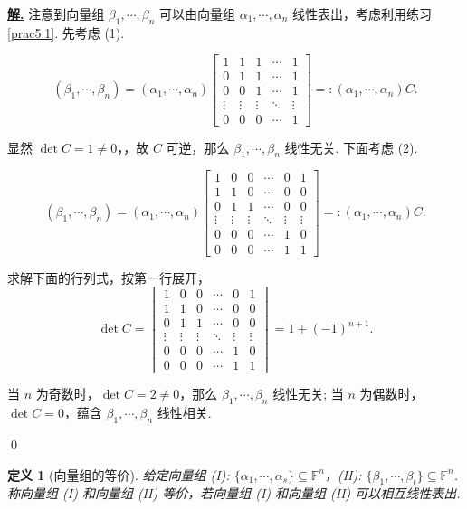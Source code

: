 \documentclass[10pt,openany]{article}
\theoremstyle{thmstyle} %
\theoremstyle{defstyle} %
\newtheorem{definition}[theorem]{定义}
\theoremstyle{prostyle} %
\theoremstyle{exastyle}
\theoremstyle{remstyle}
\newenvironment{solution}{\par\underline{\textbf{解.}} \;\fangsong}{\qed\par}
\newcommand{\F}{\mathbb{F}}
\begin{document}
\begin{solution}
	注意到向量组 \( \beta_1,\cdots,\beta_n \) 可以由向量组  \( \alpha_1,\cdots,\alpha_n \) 线性表出，考虑利用练习 \ref{prac5.1}. 先考虑 (1).
	
	\[ (\beta_1,\cdots,\beta_n)=(\alpha_1,\cdots,\alpha_n)\begin{bmatrix}
		1 & 1 & 1 & \cdots & 1 \\
		0 & 1 & 1 & \cdots & 1 \\
		0 & 0 & 1 & \cdots & 1 \\
		\vdots & \vdots & \vdots & \ddots & \vdots \\
		0 & 0 & 0 & \cdots & 1
	\end{bmatrix}=:(\alpha_1,\cdots,\alpha_n)C. \]
	
	显然 \( \det C =1 \neq 0 \)，，故 \( C \) 可逆，那么 \( \beta_1,\cdots,\beta_n \) 线性无关. 下面考虑 (2).
	
	\[ (\beta_1,\cdots,\beta_n)=(\alpha_1,\cdots,\alpha_n)\begin{bmatrix}
	1 & 0 & 0 & \cdots & 0 & 1 \\
	1 & 1 & 0 & \cdots & 0 & 0 \\
	0 & 1 & 1 & \cdots & 0 & 0 \\
	\vdots & \vdots & \vdots & \ddots & \vdots & \vdots \\
	0 & 0 & 0 & \cdots & 1 & 0 \\
	0 & 0 & 0 & \cdots & 1 & 1
	\end{bmatrix}=:(\alpha_1,\cdots,\alpha_n)C. \]
	
	求解下面的行列式，按第一行展开，
	\[ \det C= \begin{vmatrix}
		1 & 0 & 0 & \cdots & 0 & 1 \\
		1 & 1 & 0 & \cdots & 0 & 0 \\
		0 & 1 & 1 & \cdots & 0 & 0 \\
		\vdots & \vdots & \vdots & \ddots & \vdots & \vdots \\
		0 & 0 & 0 & \cdots & 1 & 0 \\
		0 & 0 & 0 & \cdots & 1 & 1
	\end{vmatrix}= 1+(-1)^{n+1}. \]
	
	当 \( n \) 为奇数时，\( \det C=2 \neq 0 \)，那么 \( \beta_1,\cdots,\beta_n \) 线性无关; 当 \( n \) 为偶数时，\( \det C=0 \)，蕴含 \( \beta_1,\cdots,\beta_n \) 线性相关. 
	
	
	
\end{solution}


\begin{definition}[向量组的等价]
	给定向量组 (I): \( \{\alpha_1,\cdots,\alpha_s\} \subseteq \F^n \)，(II): \( \{\beta_1,\cdots,\beta_t\} \subseteq \F^n \). 称向量组 (I) 和向量组 (II) 等价，若向量组 (I) 和向量组 (II) 可以相互线性表出.
\end{definition}
\end{document}
